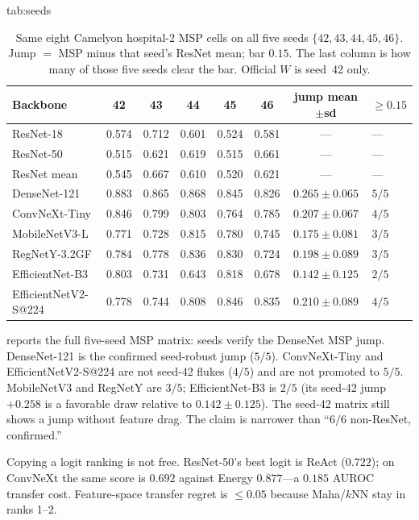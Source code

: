 \documentclass[anon]{midl}
\begin{document}
\begin{table}[t]
\floatconts
  {tab:seeds}
  {\caption{Same eight Camelyon hospital-2 MSP cells on all five seeds $\{42,43,44,45,46\}$.
  Jump ${=}$ MSP minus that seed's ResNet mean; bar $0.15$.
  The last column is how many of those five seeds clear the bar.
  Official $W$ is seed~42 only.}}
  {\footnotesize
  \begin{tabular}{@{}lccccccl@{}}
  \toprule
  Backbone & 42 & 43 & 44 & 45 & 46 & jump mean${\pm}$sd & ${\ge}0.15$ \\
  \midrule
  ResNet-18 & 0.574 & 0.712 & 0.601 & 0.524 & 0.581 & --- & --- \\
  ResNet-50 & 0.515 & 0.621 & 0.619 & 0.515 & 0.661 & --- & --- \\
  ResNet mean & 0.545 & 0.667 & 0.610 & 0.520 & 0.621 & --- & --- \\
  DenseNet-121 & 0.883 & 0.865 & 0.868 & 0.845 & 0.826 & $0.265{\pm}0.065$ & $5/5$ \\
  ConvNeXt-Tiny & 0.846 & 0.799 & 0.803 & 0.764 & 0.785 & $0.207{\pm}0.067$ & $4/5$ \\
  MobileNetV3-L & 0.771 & 0.728 & 0.815 & 0.780 & 0.745 & $0.175{\pm}0.081$ & $3/5$ \\
  RegNetY-3.2GF & 0.784 & 0.778 & 0.836 & 0.830 & 0.724 & $0.198{\pm}0.089$ & $3/5$ \\
  EfficientNet-B3 & 0.803 & 0.731 & 0.643 & 0.818 & 0.678 & $0.142{\pm}0.125$ & $2/5$ \\
  EfficientNetV2-S@224 & 0.778 & 0.744 & 0.808 & 0.846 & 0.835 & $0.210{\pm}0.089$ & $4/5$ \\
  \bottomrule
  \end{tabular}}
\end{table}

 reports the full five-seed MSP matrix: seeds verify the DenseNet MSP jump.
DenseNet-121 is the confirmed seed-robust jump ($5/5$).
ConvNeXt-Tiny and EfficientNetV2-S@224 are not seed-42 flukes ($4/5$) and are not promoted to $5/5$.
MobileNetV3 and RegNetY are $3/5$; EfficientNet-B3 is $2/5$ (its seed-42 jump $+0.258$ is a favorable draw relative to $0.142{\pm}0.125$).
The seed-42 matrix still shows a jump without feature drag.
The claim is narrower than ``$6/6$ non-ResNet, confirmed.''

Copying a logit ranking is not free.
ResNet-50's best logit is ReAct ($0.722$); on ConvNeXt the same score is $0.692$ against Energy $0.877$---a $0.185$ AUROC transfer cost.
Feature-space transfer regret is ${\le}0.05$ because Maha/$k$NN stay in ranks 1--2.
\end{document}
